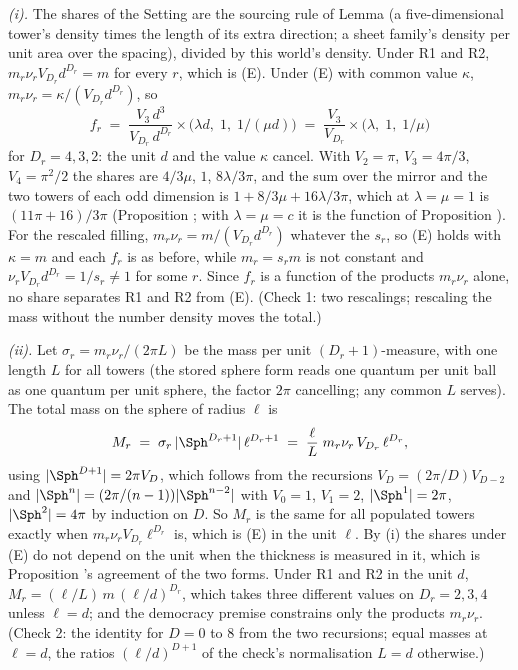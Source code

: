\emph{(i).} The shares of the Setting are the sourcing rule of Lemma  (a five-dimensional tower's density times the length of its extra direction; a sheet family's density per unit area over the spacing), divided by this world's density. Under R1 and R2, $m_{r}\nu_{r}V_{D_{r}}d^{D_{r}} = m$ for every $r$, which is (E). Under (E) with common value $\kappa$, $m_{r}\nu_{r} = \kappa/(V_{D_{r}}d^{D_{r}})$, so
\[
f_{r} \;=\; \frac{V_{3}\,d^{3}}{V_{D_{r}}\,d^{D_{r}}} \times \bigl(\lambda d,\; 1,\; 1/(\mu d)\bigr)
\;=\; \frac{V_{3}}{V_{D_{r}}} \times \bigl(\lambda,\; 1,\; 1/\mu\bigr)
\]
for $D_{r} = 4, 3, 2$: the unit $d$ and the value $\kappa$ cancel. With $V_{2} = \pi$, $V_{3} = 4\pi/3$, $V_{4} = \pi^{2}/2$ the shares are $4/3\mu$, $1$, $8\lambda/3\pi$, and the sum over the mirror and the two towers of each odd dimension is $1 + 8/3\mu + 16\lambda/3\pi$, which at $\lambda = \mu = 1$ is $(11\pi + 16)/3\pi$ (Proposition ; with $\lambda = \mu = c$ it is the function of Proposition ). For the rescaled filling, $m_{r}\nu_{r} = m/(V_{D_{r}}d^{D_{r}})$ whatever the $s_{r}$, so (E) holds with $\kappa = m$ and each $f_{r}$ is as before, while $m_{r} = s_{r}m$ is not constant and $\nu_{r}V_{D_{r}}d^{D_{r}} = 1/s_{r} \neq 1$ for some $r$. Since $f_{r}$ is a function of the products $m_{r}\nu_{r}$ alone, no share separates R1 and R2 from (E). (Check 1: two rescalings; rescaling the mass without the number density moves the total.)

\emph{(ii).} Let $\sigma_{r} = m_{r}\nu_{r}/(2\pi L)$ be the mass per unit $(D_{r}+1)$-measure, with one length $L$ for all towers (the stored sphere form reads one quantum per unit ball as one quantum per unit sphere, the factor $2\pi$ cancelling; any common $L$ serves). The total mass on the sphere of radius $\ell$ is
\[
M_{r} \;=\; \sigma_{r}\,|\Sph^{D_{r}+1}|\,\ell^{D_{r}+1} \;=\; \frac{\ell}{L}\; m_{r}\nu_{r}\,V_{D_{r}}\,\ell^{D_{r}},
\]
using $|\Sph^{D+1}| = 2\pi V_{D}$, which follows from the recursions $V_{D} = (2\pi/D)V_{D-2}$ and $|\Sph^{n}| = (2\pi/(n-1))|\Sph^{n-2}|$ with $V_{0} = 1$, $V_{1} = 2$, $|\Sph^{1}| = 2\pi$, $|\Sph^{2}| = 4\pi$ by induction on $D$. So $M_{r}$ is the same for all populated towers exactly when $m_{r}\nu_{r}V_{D_{r}}\ell^{D_{r}}$ is, which is (E) in the unit $\ell$. By (i) the shares under (E) do not depend on the unit when the thickness is measured in it, which is Proposition 's agreement of the two forms. Under R1 and R2 in the unit $d$, $M_{r} = (\ell/L)\,m\,(\ell/d)^{D_{r}}$, which takes three different values on $D_{r} = 2, 3, 4$ unless $\ell = d$; and the democracy premise constrains only the products $m_{r}\nu_{r}$. (Check 2: the identity for $D = 0$ to $8$ from the two recursions; equal masses at $\ell = d$, the ratios $(\ell/d)^{D+1}$ of the check's normalisation $L = d$ otherwise.)

